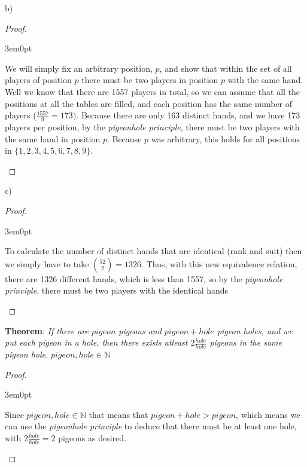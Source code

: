 \documentclass[11pt]{article}
\newcommand{\N}{\mathbb{N}}
\newenvironment{myproof}
{\begin{proof} \begin{adjustwidth}{3em}{0pt}$ $\par\nobreak\ignorespaces}
{\end{adjustwidth} \end{proof}}
\begin{document}
\begin{flushleft}
b)

\begin{myproof}
We will simply fix an arbitrary position, $p$, and show that within the set of all players of position $p$ there must be two players in position $p$ with the same hand. Well we know that there are 1557 players in total, so we can assume that all the positions at all the tables are filled, and each position has the same number of players ($\frac{1557}{9} = 173)$. Because there are only 163 distinct hands, and we have 173 players per position, by the \textit{pigeonhole principle}, there must be two players with the same hand in position $p$. Because $p$ was arbitrary, this holds for all positions in $\{1,2,3,4,5,6,7,8,9\}$.
\end{myproof}

c)

\begin{myproof}
To calculate the number of distinct hands that are identical (rank and suit) then we simply have to take ${52 \choose 2} = 1326$. Thus, with this new equivalence relation, there are 1326 different hands, which is less than 1557, so by the \textit{pigeonhole principle}, there must be two players with the identical hands
\end{myproof}

\newpage

\textbf{Theorem}: \textit{If there are $pigeon$ pigeons and $pigeon + hole$ pigeon holes, and we put each pigeon in a hole, then there exists atleast $2\frac{hole}{hole}$ pigeons in the same pigeon hole.} $pigeon, hole \in \N$

\begin{myproof}
Since $pigeon, hole \in \N$ that means that $pigeon + hole > pigeon$, which means we can use the \textit{pigeonhole principle} to deduce that there must be at least one hole, with $2 \frac{hole}{hole} = 2$ pigeons as desired.
\end{myproof}


\end{flushleft}
\end{document}
